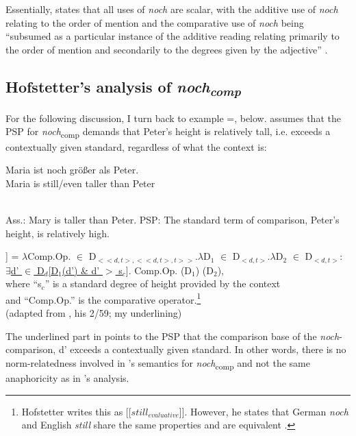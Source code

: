 \documentclass[output=paper
,modfonts
,nonflat]{langsci/langscibook}
\begin{document}
\noindent Essentially, \citeauthor{umbach2009a_comp} states that all uses of \textit{noch} are scalar, with the additive use of \textit{noch} relating to the order of mention and the comparative use of \textit{noch} being ``subsumed as a particular instance of the additive reading relating primarily to the order of mention and secondarily to the degrees given by the adjective'' \citet[14]{umbach2009a_comp}.

\subsection{Hofstetter's \citeyearpar{Hofstetter2013} analysis of \textit{noch\textsubscript{comp}}}

For the following discussion, I turn back to example  =, below. \citet{Hofstetter2013} assumes that the PSP for \textit{noch}\textsubscript{comp} demands that Peter's height is relatively tall, i.e. exceeds a contextually given standard, regardless of what the context is:

\ea\gll Maria ist noch größer als Peter.\\
Maria is still/even taller than Peter\\
 \label{NOCH_COMP_EXP_repeat}\\
\z

\ea \label{NOCH_COMP_meaning_components} \ea Ass.: Mary is taller than Peter.
\ex PSP: The standard term of comparison, Peter's height, is relatively high.\label{NOCH_COMP_PSP_00} \\
\z\z

\ea\relax [[noch\textsubscript{comp}]] = $\lambda$Comp.Op. $\in$ D$_{<<d,t>,<<d,t>,t>>}$.$\lambda$D$_1$ $\in$ D$_{<d,t>}$.$\lambda$D$_2$ $\in$ D$_{<d,t>}$: \\\underline{$\exists$d' $\in$ D$_d$[D$_1$(d') \& d' $>$ s$_c$}]. Comp.Op. (D$_1$) (D$_2$),\\ where ``s$_c$'' is a standard degree of height provided by the context \\and ``Comp.Op.'' is the comparative operator.\footnote{ Hofstetter writes this as [[$still_{evaluative}$]]. However, he states that German \textit{noch} and English \textit{still} share the same properties and are equivalent \citet[31]{Hofstetter2013}.} \label{HS_entry_comp} 
\\ (adapted from \citeyearpar{Hofstetter2013}, his 2/59; my underlining)\z

The underlined part in  points to the PSP that the comparison base of the \textit{noch}-comparison, d' exceeds a contextually given standard. In other words, there is no norm-relatedness involved in \citeauthor{Hofstetter2013}'s semantics for \textit{noch}\textsubscript{comp} and not the same anaphoricity as in \citeauthor{umbach2009a_comp}'s \citeyearpar{umbach2009a_comp} analysis.
\end{document}
